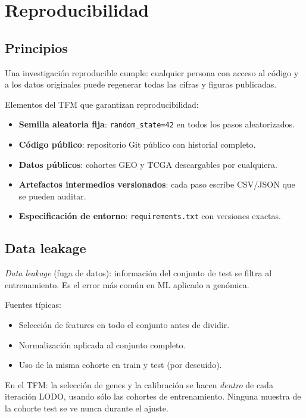 \documentclass[11pt, a4paper]{article}
\begin{document}
\section{Reproducibilidad}

\subsection{Principios}

Una investigaci\'on reproducible cumple: cualquier persona con acceso
al c\'odigo y a los datos originales puede regenerar todas las cifras y
figuras publicadas.

Elementos del TFM que garantizan reproducibilidad:

\begin{itemize}[leftmargin=1.2em]
  \item \textbf{Semilla aleatoria fija}: \texttt{random\_state=42} en
  todos los pasos aleatorizados.
  \item \textbf{C\'odigo p\'ublico}: repositorio Git p\'ublico con
  historial completo.
  \item \textbf{Datos p\'ublicos}: cohortes GEO y TCGA descargables por
  cualquiera.
  \item \textbf{Artefactos intermedios versionados}: cada paso escribe
  CSV/JSON que se pueden auditar.
  \item \textbf{Especificaci\'on de entorno}: \texttt{requirements.txt}
  con versiones exactas.
\end{itemize}

\subsection{Data leakage}

\emph{Data leakage} (fuga de datos): informaci\'on del conjunto de test
se filtra al entrenamiento. Es el error m\'as com\'un en ML aplicado a
gen\'omica.

Fuentes t\'ipicas:
\begin{itemize}[leftmargin=1.2em]
  \item Selecci\'on de features en todo el conjunto antes de dividir.
  \item Normalizaci\'on aplicada al conjunto completo.
  \item Uso de la misma cohorte en train y test (por descuido).
\end{itemize}

En el TFM: la selecci\'on de genes y la calibraci\'on se hacen
\emph{dentro} de cada iteraci\'on LODO, usando s\'olo las cohortes de
entrenamiento. Ninguna muestra de la cohorte test se ve nunca durante
el ajuste.
\end{document}
